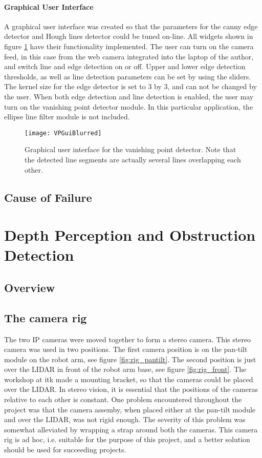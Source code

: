 \paragraph{Graphical User Interface}

A graphical user interface was created so that the parameters for the canny edge detector and Hough lines detector could be tuned on-line. All widgets shown in figure \ref{fig:vpGui} have their functionality implemented. The user can turn on the camera feed, in this case from the web camera integrated into the laptop of the author, and switch line and edge detection on or off. Upper and lower edge detection thresholds, as well as line detection parameters can be set by using the sliders. The kernel size for the edge detector is set to 3 by 3, and can not be changed by the user. When both edge detection and line detection is enabled, the user may turn on the vanishing point detector module. In this particular application, the ellipse line filter module is not included.

\begin{figure}
	\texttt{[image: VPGuiBlurred]}
	\caption{Graphical user interface for the vanishing point detector. Note that the detected line segments are actually several lines overlapping each other.}
	\label{fig:vpGui}
\end{figure}

\subsection{Cause of Failure}

\section{Depth Perception and Obstruction Detection}

\subsection{Overview}

\subsection{The camera rig}

The two IP cameras were moved together to form a stereo camera. This stereo camera was used in two positions. The first camera position is on the pan-tilt module on the robot arm, see figure \ref{fig:rig_pantilt}. The second position is just over the LIDAR in front of the robot arm base, see figure \ref{fig:rig_front}.  The workshop at \gls{itk} made a mounting bracket, so that the cameras could be placed over the LIDAR. In stereo vision, it is essential that the positions of the cameras relative to each other is constant. One problem encountered throughout the project was that the camera assemby, when placed either at the pan-tilt module and over the LIDAR, was not rigid enough. The severity of this problem was somewhat alleviated by wrapping a strap around both the cameras. This camera rig is ad hoc, i.e. suitable for the purpose of this project, and a better solution should be used for succeeding projects.

